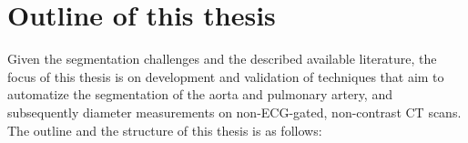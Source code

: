 



\section{Outline of this thesis} \label{sec:Goals}
Given the segmentation challenges and the described available literature, the focus of this thesis is on development and validation of techniques that aim to automatize the segmentation of the aorta and pulmonary artery, and subsequently diameter measurements on non-ECG-gated, non-contrast \gls{CT} scans. The outline and the structure of this thesis is as follows:

